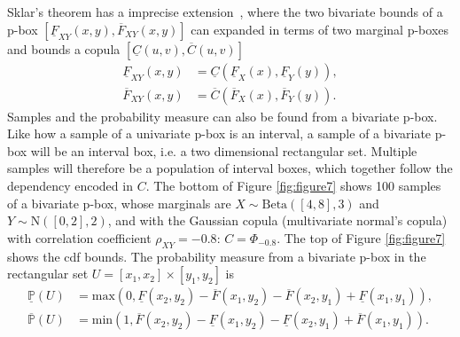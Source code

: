 \documentclass{juliacon}
\begin{document}
Sklar's theorem has a imprecise extension~\cite{montes2015sklar}, where the two bivariate bounds of a p-box $[\underline{F}_{XY}(x,y), \overline{F}_{XY}(x,y)]$ can expanded in terms of two marginal p-boxes and bounds a copula $[\underline{C}(u,v), \overline{C}(u,v)]$
\begin{align*}
  \underline{F}_{XY}(x,y) &= \underline{C}(\underline{F}_{X}(x), \underline{F}_{Y}(y)), \\ 
  \overline{F}_{XY}(x,y) &= \overline{C}(\overline{F}_{X}(x), \overline{F}_{Y}(y)).
\end{align*}
Samples and the probability measure can also be found from a bivariate p-box. Like how a sample of a univariate p-box is an interval, a sample of a bivariate p-box will be an interval box, i.e. a two dimensional rectangular set. Multiple samples will therefore be a population of interval boxes, which together follow the dependency encoded in $C$. The bottom of Figure \ref{fig:figure7} shows 100 samples of a bivariate p-box, whose marginals are $X \sim \text{Beta}([4,8], 3)$ and $Y \sim \text{N}([0,2], 2)$, and with the Gaussian copula (multivariate normal's copula) with correlation coefficient $\rho_{XY} = -0.8$: $C = \Phi_{-0.8}$. The top of Figure \ref{fig:figure7} shows the cdf bounds. The probability measure from a bivariate p-box in the rectangular set $ U = [x_{1}, x_{2}] \times [y_{1}, y_{2}]$ is
\begin{align*}
  \underline{\mathbb{P}}(U) &= \text{max}(0, \underline{F}(x_{2}, y_{2}) - \overline{F}(x_{1}, y_{2}) - \overline{F}(x_{2}, y_{1}) + \underline{F}(x_{1}, y_{1})) ,\\ 
  \overline{\mathbb{P}}(U)  &= \text{min}(1, \overline{F}(x_{2}, y_{2}) - \underline{F}(x_{1}, y_{2}) - \underline{F}(x_{2}, y_{1}) + \overline{F}(x_{1}, y_{1}) ).
\end{align*}
\end{document}
